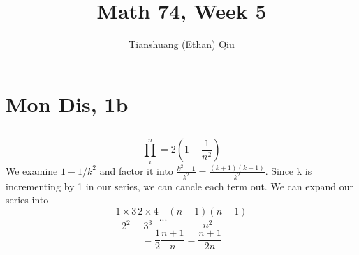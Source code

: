 \documentclass[12pt]{article}
\author{Tianshuang (Ethan) Qiu}
\begin{document}
\title{Math 74, Week 5}
\maketitle

\section{Mon Dis, 1b}

\subsection{}


\subsection{}

$$\prod^n_i=2 (1-\frac{1}{n^2})$$
We examine $1-1/k^2$ and factor it into $\frac{k^2-1}{k^2} = \frac{(k+1)(k-1)}{k^2}$. Since k is incrementing by 1 in our series, we can cancle each term out. We can expand our series into
$$\frac{1\times 3}{2^2} \frac{2 \times 4}{3^3} ... \frac{(n-1)(n+1)}{n^2}$$
$$= \frac{1}{2} \frac{n+1}{n} = \frac{n+1}{2n}$$
\end{document}
